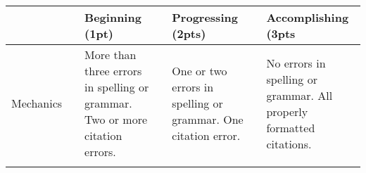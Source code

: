 \documentclass[]{article}
\begin{document}
\begin{longtable}[]{@{}lllllll@{}}
\toprule
\begin{minipage}[b]{0.19\columnwidth}\raggedright
\strut
\end{minipage} & \begin{minipage}[b]{0.03\columnwidth}\raggedright
\strut
\end{minipage} & \begin{minipage}[b]{0.16\columnwidth}\raggedright
Beginning (1pt)\strut
\end{minipage} & \begin{minipage}[b]{0.03\columnwidth}\raggedright
\strut
\end{minipage} & \begin{minipage}[b]{0.19\columnwidth}\raggedright
Progressing (2pts)\strut
\end{minipage} & \begin{minipage}[b]{0.03\columnwidth}\raggedright
\strut
\end{minipage} & \begin{minipage}[b]{0.20\columnwidth}\raggedright
Accomplishing (3pts\strut
\end{minipage}\tabularnewline
\midrule
\endhead
\begin{minipage}[t]{0.19\columnwidth}\raggedright
Mechanics\strut
\end{minipage} & \begin{minipage}[t]{0.03\columnwidth}\raggedright
\strut
\end{minipage} & \begin{minipage}[t]{0.16\columnwidth}\raggedright
More than three errors in spelling or grammar. Two or more citation
errors.\strut
\end{minipage} & \begin{minipage}[t]{0.03\columnwidth}\raggedright
\strut
\end{minipage} & \begin{minipage}[t]{0.19\columnwidth}\raggedright
One or two errors in spelling or grammar. One citation error.\strut
\end{minipage} & \begin{minipage}[t]{0.03\columnwidth}\raggedright
\strut
\end{minipage} & \begin{minipage}[t]{0.20\columnwidth}\raggedright
No errors in spelling or grammar. All properly formatted
citations.\strut
\end{minipage}\tabularnewline
\begin{minipage}[t]{0.19\columnwidth}\raggedright

\end{minipage}
\end{longtable}
\end{document}
